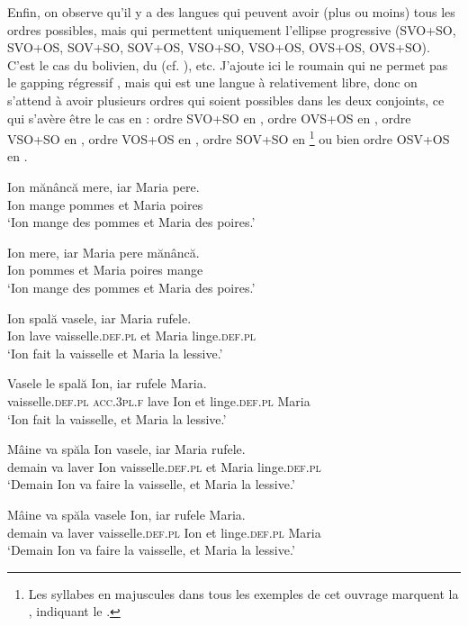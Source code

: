 Enfin, on observe qu’il y a des langues qui peuvent avoir (plus ou moins) tous les ordres possibles, mais qui permettent uniquement l’ellipse progressive (SVO+SO, SVO+OS, SOV+SO, SOV+OS, VSO+SO, VSO+OS, OVS+OS, OVS+SO). C’est le cas du  bolivien, du  (cf. \citealt{Pulte1971,Pulte1973}), etc. J’ajoute ici le roumain qui ne permet pas le gapping régressif , mais qui est une langue à  relativement libre, donc on s’attend à avoir plusieurs ordres qui soient possibles dans les deux conjoints, ce qui s’avère être le cas en : ordre SVO+SO en , ordre OVS+OS en , ordre VSO+SO en , ordre VOS+OS en , ordre SOV+SO en \footnote{Les syllabes en majuscules dans tous les exemples de cet ouvrage marquent la , indiquant le .} ou bien ordre OSV+OS en .

\ea \label{ch2:ex13}
\ea
\gll Ion mănâncă mere, iar Maria pere.\\
Ion mange pommes et Maria poires\\
\glt ‘Ion mange des pommes et Maria des poires.’

\ex 
\gll *Ion mere, iar Maria pere mănâncă.\\
Ion pommes et Maria poires mange\\
\glt ‘Ion mange des pommes et Maria des poires.’
\z
\z

\ea \label{ch2:ex14}
\ea 
\gll Ion spală vasele, iar Maria rufele. \label{ch2:ex14a}\\
Ion lave vaisselle.\textsc{def.pl} et Maria linge.\textsc{def.pl}\\
\glt ‘Ion fait la vaisselle et Maria la lessive.’

\ex 
\gll Vasele le spală Ion, iar rufele Maria. \label{ch2:ex14b} \\
vaisselle.\textsc{def.pl} \textsc{acc.3pl.f} lave Ion et linge.\textsc{def.pl} Maria\\
\glt ‘Ion fait la vaisselle, et Maria la lessive.’

\ex 
\gll Mâine va spăla Ion vasele, iar Maria rufele. \label{ch2:ex14c} \\
demain va laver Ion vaisselle.\textsc{def.pl} et Maria linge.\textsc{def.pl}\\
\glt ‘Demain Ion va faire la vaisselle, et Maria la lessive.’

\ex 
\gll Mâine va spăla vasele Ion, iar rufele Maria. \label{ch2:ex14d} \\
demain va laver vaisselle.\textsc{def.pl} Ion et linge.\textsc{def.pl} Maria\\
\glt ‘Demain Ion va faire la vaisselle, et Maria la lessive.’

